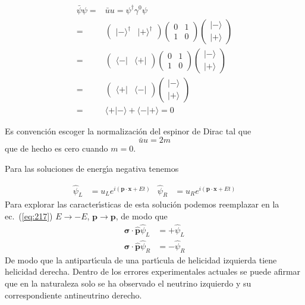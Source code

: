 \begin{align}
  \bar{\psi}\psi=&\bar{u}{u}=\psi^\dagger \gamma^0 \psi\nonumber\\
  =&\begin{pmatrix}
    |-\rangle^\dagger & |+\rangle^\dagger
  \end{pmatrix}
  \begin{pmatrix}
    0&1\\
    1&0    
  \end{pmatrix}
  \begin{pmatrix}
    |-\rangle\\
    |+\rangle
  \end{pmatrix}\nonumber\\
  =&\begin{pmatrix}
    \langle-| & \langle+|
  \end{pmatrix}
  \begin{pmatrix}
    0&1\\
    1&0    
  \end{pmatrix}
  \begin{pmatrix}
    |-\rangle\\
    |+\rangle
  \end{pmatrix}\nonumber\\
  =&\begin{pmatrix}
    \langle+| & \langle-| 
  \end{pmatrix}
  \begin{pmatrix}
    |-\rangle\\
    |+\rangle
  \end{pmatrix}\nonumber\\
  =&\langle+|-\rangle+\langle-|+\rangle=0
\end{align}

Es convención escoger la normalización del espinor de Dirac tal que
\begin{equation}
  \bar{u}{u}=2m
\end{equation}
que de hecho es cero cuando $m=0$.

Para las soluciones de energ\'\i a negativa tenemos

\begin{align}
    \hat{\psi}_L&=u_L e^{i(\mathbf{p}\cdot \mathbf{x}+E t)} & \hat{\psi}_R&=u_R e^{i(\mathbf{p}\cdot \mathbf{x}+E t)}
\end{align}
Para explorar las caracter\'\i sticas de esta soluci\'on podemos reemplazar en la ec.~(\ref{eq:217}) $E\to-E$, $\mathbf{p}\to\mathbf{p}$, de modo que
\begin{align}
  \boldsymbol{\sigma}\cdot\hat{\mathbf{p}}\hat{\psi}_L &=+\hat{\psi}_L\nonumber\\
  \boldsymbol{\sigma}\cdot\hat{\mathbf{p}}\hat{\psi}_R&=-\hat{\psi}_R
\end{align}
De modo que la antipart\'\i cula de una part\'\i cula de helicidad izquierda tiene helicidad derecha. Dentro de los errores experimentales actuales se puede afirmar que en la naturaleza solo se ha observado el neutrino izquierdo y su correspondiente antineutrino derecho.

